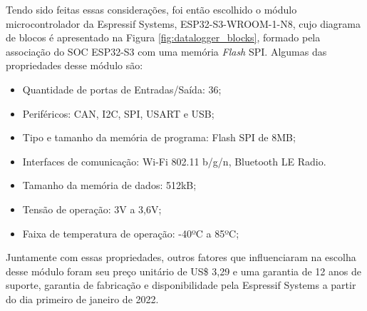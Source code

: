 Tendo sido feitas essas considerações, foi então escolhido o módulo microcontrolador da Espressif Systems, ESP32-S3-WROOM-1-N8, cujo diagrama de blocos é apresentado na Figura \ref{fig:datalogger_blocks}, formado pela associação do \gls{SOC} ESP32-S3 com uma memória \textit{Flash} \gls{SPI}. Algumas das propriedades desse módulo são:

    \begin{itemize}
        \item Quantidade de portas de Entradas/Saída: 36;
        \item Periféricos: CAN, I2C, SPI, USART e USB;
        \item Tipo e tamanho da memória de programa: Flash SPI de 8MB;
        \item Interfaces de comunicação: Wi-Fi 802.11 b/g/n, Bluetooth LE Radio.
        \item Tamanho da memória de dados: 512kB;
        \item Tensão de operação: 3V a 3,6V;
        \item Faixa de temperatura de operação: -40ºC a 85ºC;
    \end{itemize}
    
    
    
    
    
    

Juntamente com essas propriedades, outros fatores que influenciaram na escolha desse módulo foram seu preço unitário de US\$ 3,29 e uma garantia de 12 anos de suporte,  garantia de fabricação e disponibilidade pela Espressif Systems a partir do dia primeiro de janeiro de 2022. 



